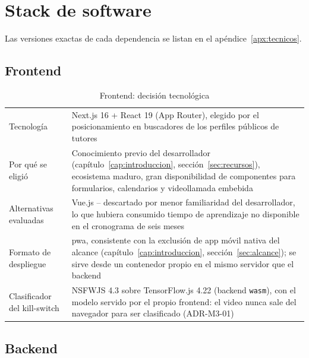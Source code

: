 \section{Stack de software}

Las versiones exactas de cada dependencia se listan en el
apéndice~\ref{apx:tecnicos}.

\subsection{Frontend}

\begin{table}[H]
    \centering
    \caption{Frontend: decisión tecnológica}
    \label{tab:stack-frontend}
    \small
    \begin{tabularx}{\textwidth}{l L}
        \toprule
         &  \\
        \midrule
        Tecnología & Next.js 16 + React 19 (App Router), elegido por el posicionamiento en buscadores de los perfiles públicos de tutores \\
        Por qué se eligió & Conocimiento previo del desarrollador (capítulo~\ref{cap:introduccion}, sección~\ref{sec:recursos}), ecosistema maduro, gran disponibilidad de componentes para formularios, calendarios y videollamada embebida \\
        Alternativas evaluadas & Vue.js -- descartado por menor familiaridad del desarrollador, lo que hubiera consumido tiempo de aprendizaje no disponible en el cronograma de seis meses \\
        Formato de despliegue & \gls{pwa}, consistente con la exclusión de app móvil nativa del alcance (capítulo~\ref{cap:introduccion}, sección~\ref{sec:alcance}); se sirve desde un contenedor propio en el mismo servidor que el backend \\
        Clasificador del kill-switch & NSFWJS 4.3 sobre TensorFlow.js 4.22 (backend \texttt{wasm}), con el modelo servido por el propio frontend: el video nunca sale del navegador para ser clasificado (ADR-M3-01) \\
        \bottomrule
    \end{tabularx}
\end{table}

\subsection{Backend}\label{sec:stack-backend}

